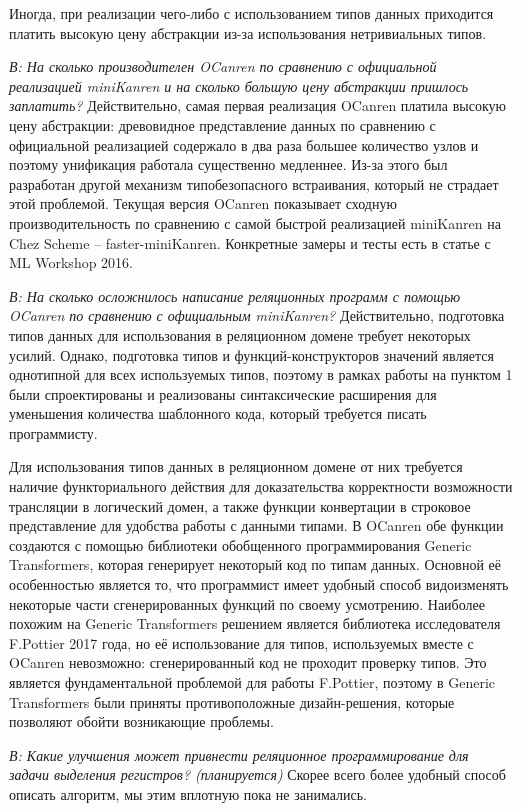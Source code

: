 Иногда, при реализации чего-либо с использованием типов данных приходится платить высокую цену абстракции из-за использования нетривиальных типов.

\emph{В: На сколько производителен OCanren по сравнению с официальной реализацией miniKanren и на сколько большую цену абстракции пришлось заплатить?}
Действительно, самая первая реализация OCanren платила высокую цену абстракции: древовидное представление данных по сравнению с официальной реализацией содержало в два раза большее количество узлов и поэтому унификация работала существенно медленнее. Из-за этого был разработан другой механизм типобезопасного встраивания, который не страдает этой проблемой. Текущая версия OCanren показывает сходную производительность по сравнению с самой быстрой реализацией miniKanren на Chez Scheme -- faster-miniKanren. Конкретные замеры и тесты есть в статье с ML Workshop 2016.

\emph{В: На сколько осложнилось написание реляционных программ с помощью OCanren по сравнению с официальным miniKanren?}
Действительно, подготовка типов данных для использования в реляционном домене требует некоторых усилий. Однако, подготовка типов и функций-конструкторов значений является однотипной для всех используемых типов, поэтому в рамках работы на пунктом 1 были спроектированы и реализованы синтаксические расширения для уменьшения количества шаблонного кода, который требуется писать программисту.

Для использования типов данных в реляционном домене от них требуется наличие функториального действия для доказательства корректности возможности трансляции в логический домен, а также функции конвертации в строковое представление для удобства работы с данными типами. В OCanren обе функции создаются с помощью библиотеки обобщенного программирования Generic Transformers, которая генерирует некоторый код по типам данных. Основной её особенностью является то, что программист имеет удобный способ видоизменять некоторые части сгенерированных функций по своему усмотрению. Наиболее похожим на Generic Transformers решением является библиотека исследователя F.Pottier 2017 года, но её использование для типов, используемых вместе с OCanren невозможно: сгенерированный код не проходит проверку типов. Это является фундаментальной проблемой для работы F.Pottier, поэтому в Generic Transformers были приняты противоположные дизайн-решения, которые позволяют обойти возникающие проблемы.

\emph{В: Какие улучшения может привнести реляционное программирование для задачи выделения регистров? (планируется)}
Скорее всего более удобный способ описать алгоритм, мы этим вплотную пока не занимались.

